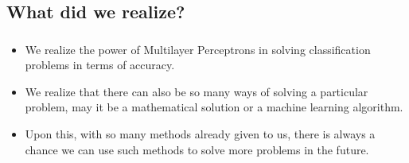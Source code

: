 \subsection{What did we realize?}
\begin{frame}
\frametitle{\subsecname}
	\begin{itemize}
		\item We realize the power of Multilayer Perceptrons in solving classification problems in terms of accuracy.
		\item We realize that there can also be so many ways of solving a particular problem, may it be a mathematical solution or a machine learning algorithm.
		\item Upon this, with so many methods already given to us, there is always a chance we can use such methods to solve more problems in the future.
	\end{itemize}
\end{frame}
